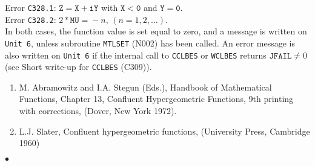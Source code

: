 Error {\tt C328.1}: $\mathtt{Z=X+iY}$ with $\mathtt{X<0}$ and
$\mathtt{Y=0}$. \\
Error {\tt C328.2}: $2*\mathtt{MU=}-n,\,(n=1,2,\ldots)$. \\
In both cases, the function value is set equal to zero,
and a message is written on
{\tt Unit 6}, unless subroutine {\tt MTLSET} (N002) has been called.
An error message is also written on {\tt Unit 6} if the internal call to
{\tt CCLBES} or {\tt WCLBES} returns $\mathtt{JFAIL} \ne 0$
(see Short write-up for {\tt CCLBES} (C309)).
\newpage
\Refer
\begin{enumerate}
\item  M. Abramowitz and I.A. Stegun (Eds.), Handbook
of Mathematical Functions,
Chapter 13, Confluent Hypergeometric Functions,
9th printing with corrections, (Dover, New York 1972).
\item L.J. Slater, Confluent hypergeometric functions, (University Press,
Cambridge 1960)
\end{enumerate}
$\bullet$

